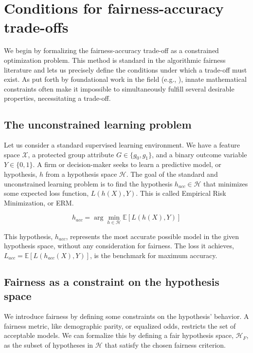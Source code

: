 \section{Conditions for fairness-accuracy trade-offs}

We begin by formalizing the fairness-accuracy trade-off as a constrained optimization problem. This method is standard in the algorithmic fairness literature and lets us precisely define the conditions under which a trade-off must exist. As put forth by foundational work in the field (e.g., \citealp{Kleinberg2017, Chouldechova2017}), innate mathematical constraints often make it impossible to simultaneously fulfill several desirable properties, necessitating a trade-off.

\subsection{The unconstrained learning problem}

Let us consider a standard supervised learning environment. We have a feature space $\mathcal{X}$, a protected group attribute $G \in \{g_0, g_1\}$, and a binary outcome variable $Y \in \{0, 1\}$. A firm or decision-maker seeks to learn a predictive model, or hypothesis, $h$ from a hypothesis space $\mathcal{H}$. The goal of the standard and unconstrained learning problem is to find the hypothesis $h_{acc} \in \mathcal{H}$ that minimizes some expected loss function, $L(h(X), Y)$. This is called Empirical Risk Minimization, or ERM.

\begin{equation}
h_{acc} = \arg\min_{h \in \mathcal{H}} \mathbb{E}[L(h(X), Y)]
\end{equation}

This hypothesis, $h_{acc}$, represents the most accurate possible model in the given hypothesis space, without any consideration for fairness. The loss it achieves, $L_{acc} = \mathbb{E}[L(h_{acc}(X), Y)]$, is the benchmark for maximum accuracy.

\subsection{Fairness as a constraint on the hypothesis space}

We introduce fairness by defining some constraints on the hypothesis' behavior. A fairness metric, like demographic parity, or equalized odds, restricts the set of acceptable models. We can formalize this by defining a fair hypothesis space, $\mathcal{H}_F$, as the subset of hypotheses in $\mathcal{H}$ that satisfy the chosen fairness criterion.

